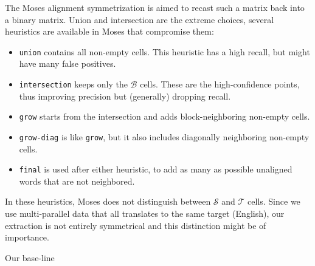 \documentclass[11pt]{article}
\begin{document}
The Moses alignment symmetrization is aimed to recast such a matrix back into a binary matrix. Union and intersection are the extreme choices, several  heuristics are available in Moses that compromise them:\begin{itemize}
\item {\tt union} contains all non-empty cells. This heuristic has a high recall, but might have many false positives.
\item  {\tt intersection} keeps only the $\mathcal B$ cells. These are the high-confidence points, thus improving precision but (generally) dropping recall.
\item {\tt grow} starts from the intersection and adds block-neighboring non-empty cells.
\item {\tt grow-diag} is like {\tt grow}, but it also includes diagonally neighboring non-empty cells.
\item {\tt final} is used after either heuristic, to add as many as possible unaligned words that are not neighbored.  %
\end{itemize}

In these heuristics, Moses does not distinguish between $\mathcal S$ and $\mathcal T$ cells. Since we use multi-parallel data that all translates to the same target (English), our extraction is not entirely symmetrical and this distinction might be of importance. 

Our base-line 
\end{document}
